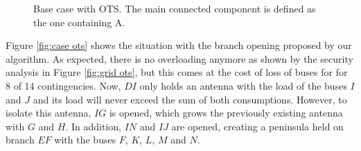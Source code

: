\begin{figure}
\begin{subfigure}
        \caption{security analysis}
        \label{fig:grid ots}
    \end{subfigure}
    \caption{Base case with OTS. 
    The main connected component is defined as the one containing A.}
    \label{fig:ots}
\end{figure}

Figure \ref{fig:case ots} shows the situation with the branch opening proposed
by our algorithm. As expected, there is no overloading anymore as shown by the
security analysis in Figure \ref{fig:grid ots}, but this comes at the cost of loss of
buses for for 8 of 14 contingencies. Now, $DI$ only holds an antenna with the load
of the buses $I$ and $J$ and its load will never exceed the sum of both consumptions.
However, to isolate this antenna, $IG$ is opened, which grows the previously existing
antenna with $G$ and $H$. In addition, $IN$ and $IJ$ are opened, creating a
peninsula held on branch $EF$ with the buses $F$, $K$, $L$, $M$ and $N$.

